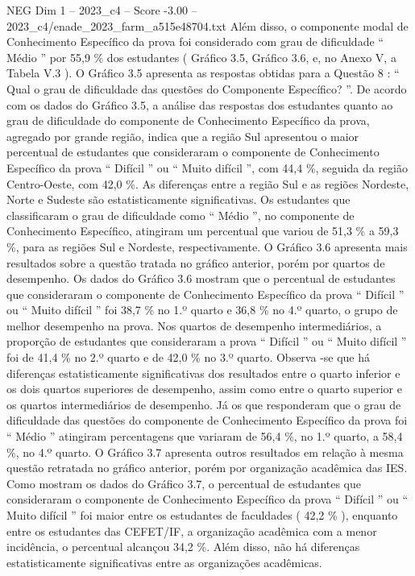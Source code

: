 \begin{textsample}{NEG Dim 1 – 2023\_c4 – Score -3.00 – 2023\_c4/enade\_2023\_farm\_a515e48704.txt}
Além disso, o componente modal de Conhecimento Específico da prova foi considerado com grau de dificuldade “ Médio ” por 55,9 \% dos estudantes ( Gráfico 3.5, Gráfico 3.6, e, no Anexo V, a Tabela V.3 ).
O Gráfico 3.5 apresenta as respostas obtidas para a Questão 8 : “ Qual o grau de dificuldade das questões do Componente Específico? ”.
De acordo com os dados do Gráfico 3.5, a análise das respostas dos estudantes quanto ao grau de dificuldade do componente de Conhecimento Específico da prova, agregado por grande região, indica que a região Sul apresentou o maior percentual de estudantes que consideraram o componente de Conhecimento Específico da prova “ Difícil ” ou “ Muito difícil ”, com 44,4 \%, seguida da região Centro-Oeste, com 42,0 \%.
As diferenças entre a região Sul e as regiões Nordeste, Norte e Sudeste são estatisticamente significativas.
Os estudantes que classificaram o grau de dificuldade como “ Médio ”, no componente de Conhecimento Específico, atingiram um percentual que variou de 51,3 \% a 59,3 \%, para as regiões Sul e Nordeste, respectivamente.
O Gráfico 3.6 apresenta mais resultados sobre a questão tratada no gráfico anterior, porém por quartos de desempenho.
Os dados do Gráfico 3.6 mostram que o percentual de estudantes que consideraram o componente de Conhecimento Específico da prova “ Difícil ” ou “ Muito difícil ” foi 38,7 \% no 1.º quarto e 36,8 \% no 4.º quarto, o grupo de melhor desempenho na prova.
Nos quartos de desempenho intermediários, a proporção de estudantes que consideraram a prova “ Difícil ” ou “ Muito difícil ” foi de 41,4 \% no 2.º quarto e de 42,0 \% no 3.º quarto.
Observa -se que há diferenças estatisticamente significativas dos resultados entre o quarto inferior e os dois quartos superiores de desempenho, assim como entre o quarto superior e os quartos intermediários de desempenho.
Já os que responderam que o grau de dificuldade das questões do componente de Conhecimento Específico da prova foi “ Médio ” atingiram percentagens que variaram de 56,4 \%, no 1.º quarto, a 58,4 \%, no 4.º quarto.
O Gráfico 3.7 apresenta outros resultados em relação à mesma questão retratada no gráfico anterior, porém por organização acadêmica das IES.
Como mostram os dados do Gráfico 3.7, o percentual de estudantes que consideraram o componente de Conhecimento Específico da prova “ Difícil ” ou “ Muito difícil ” foi maior entre os estudantes de faculdades ( 42,2 \% ), enquanto entre os estudantes das CEFET/IF, a organização acadêmica com a menor incidência, o percentual alcançou 34,2 \%.
Além disso, não há diferenças estatisticamente significativas entre as organizações acadêmicas.

\end{textsample}
